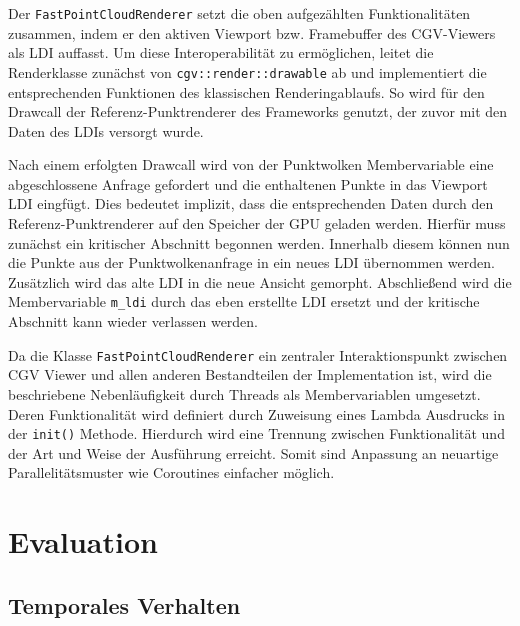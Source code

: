 \documentclass[hyperref, beleg, german]{cgvpub}
\begin{document}
Der \texttt{FastPointCloudRenderer} setzt die oben aufgezählten
Funktionalitäten zusammen, indem er den aktiven Viewport bzw. Framebuffer des
CGV-Viewers als LDI auffasst. Um diese Interoperabilität zu ermöglichen, leitet
die Renderklasse zunächst von \texttt{cgv::render::drawable} ab und
implementiert die entsprechenden Funktionen des klassischen Renderingablaufs.
So wird für den Drawcall der Referenz-Punktrenderer des Frameworks genutzt, der
zuvor mit den Daten des LDIs versorgt wurde.

Nach einem erfolgten Drawcall wird von der Punktwolken Membervariable eine
abgeschlossene Anfrage gefordert und die enthaltenen Punkte in das Viewport LDI
eingfügt. Dies bedeutet implizit, dass die entsprechenden Daten durch den
Referenz-Punktrenderer auf den Speicher der GPU geladen werden. Hierfür muss
zunächst ein kritischer Abschnitt begonnen werden. Innerhalb diesem können nun
die Punkte aus der Punktwolkenanfrage in ein neues LDI übernommen werden.
Zusätzlich wird das alte LDI in die neue Ansicht gemorpht. Abschließend wird die
Membervariable \texttt{m\_ldi} durch das eben erstellte LDI ersetzt und der
kritische Abschnitt kann wieder verlassen werden.

Da die Klasse \texttt{FastPointCloudRenderer} ein zentraler Interaktionspunkt
zwischen CGV Viewer und allen anderen Bestandteilen der Implementation ist, wird
die beschriebene Nebenläufigkeit durch Threads als Membervariablen umgesetzt.
Deren Funktionalität wird definiert durch Zuweisung eines Lambda Ausdrucks in
der \texttt{init()} Methode. Hierdurch wird eine Trennung zwischen
Funktionalität und der Art und Weise der Ausführung erreicht. Somit sind
Anpassung an neuartige Parallelitätsmuster wie Coroutines einfacher möglich.

\chapter{Evaluation}

\section{Temporales Verhalten}
\end{document}
